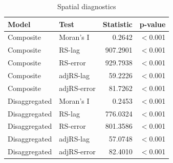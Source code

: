 \begin{table}[h]
\centering
\caption{Spatial diagnostics}
\begin{tabular}{llrr}
\toprule
Model & Test & Statistic & p-value \\
\midrule
Composite & Moran's I & 0.2642 & $<$0.001 \\
Composite & RS-lag & 907.2901 & $<$0.001 \\
Composite & RS-error & 929.7938 & $<$0.001 \\
Composite & adjRS-lag & 59.2226 & $<$0.001 \\
Composite & adjRS-error & 81.7262 & $<$0.001 \\
\midrule
Disaggregated & Moran's I & 0.2453 & $<$0.001 \\
Disaggregated & RS-lag & 776.0324 & $<$0.001 \\
Disaggregated & RS-error & 801.3586 & $<$0.001 \\
Disaggregated & adjRS-lag & 57.0748 & $<$0.001 \\
Disaggregated & adjRS-error & 82.4010 & $<$0.001 \\
\bottomrule
\end{tabular}
\end{table}

